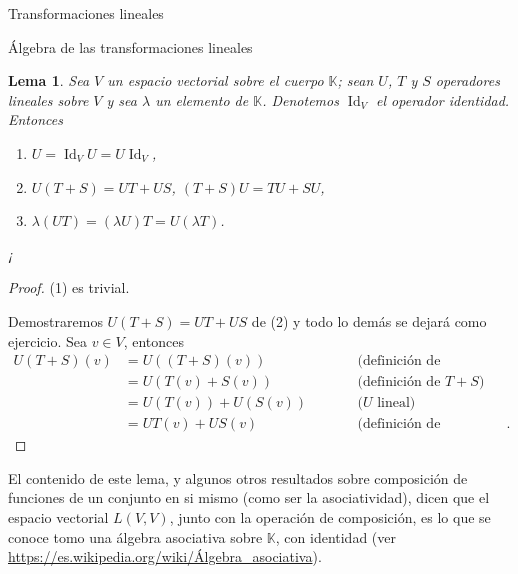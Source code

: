 \documentclass[a4paper,12pt,twoside,spanish,reqno]{amsbook}
\newtheorem{lema}[teorema]{Lema}
\theoremstyle{definition}
\theoremstyle{remark}
\newcommand{\Id}{\operatorname{Id}}
\newcommand{\K}{\mathbb K}
\begin{document}
\begin{chapter}{Transformaciones lineales}
\begin{section}{Álgebra de las transformaciones lineales}
		\begin{lema}
			Sea $V$ un espacio vectorial sobre el cuerpo $\K$; sean $U$, $T$ y $S$ operadores lineales sobre $V$ y sea $\lambda$ un elemento de $\K$. Denotemos $\Id_V$ el operador identidad. Entonces
			\begin{enumerate}
				\item $U = \Id_VU = U\Id_V$,
				\item $U(T+S) = UT + US$, $(T+S)U = TU + SU$,
				\item $\lambda (UT) = (\lambda U)T = U (\lambda T)$.
			\end{enumerate}¡
		\end{lema}
		\begin{proof}
			(1) es trivial. 
			
			Demostraremos $U(T+S) = UT + US$ de (2) y todo lo demás se dejará como ejercicio.
			Sea $ v \in V$, entonces
			\begin{equation*}
			\begin{array}{rlll}
			U(T+S)(v) &= U((T+S)(v))&\qquad&\text{(definición de composición)} \\
			&= U(T(v)+S(v))&\qquad&\text{(definición  de $T+S$)} \\
			&= U(T(v))+U(S(v))&\qquad&\text{($U$ lineal)} \\
			&= UT(v)+US(v)&\qquad&\text{(definición de composición)}.
			\end{array}
			\end{equation*}  
		\end{proof}	
	
	El contenido de este lema, y algunos otros resultados  sobre composición de funciones de un conjunto en si mismo (como ser la asociatividad), dicen que el espacio vectorial $L(V, V)$, junto con la operación de composición, es lo que se conoce tomo una  álgebra asociativa sobre $\K$,  con identidad (ver \href{https://es.wikipedia.org/wiki/Álgebra\_asociativa}{https://es.wikipedia.org/wiki/Álgebra\_asociativa}). 
	
	

		\end{section}
	

\end{chapter}
\end{document}
